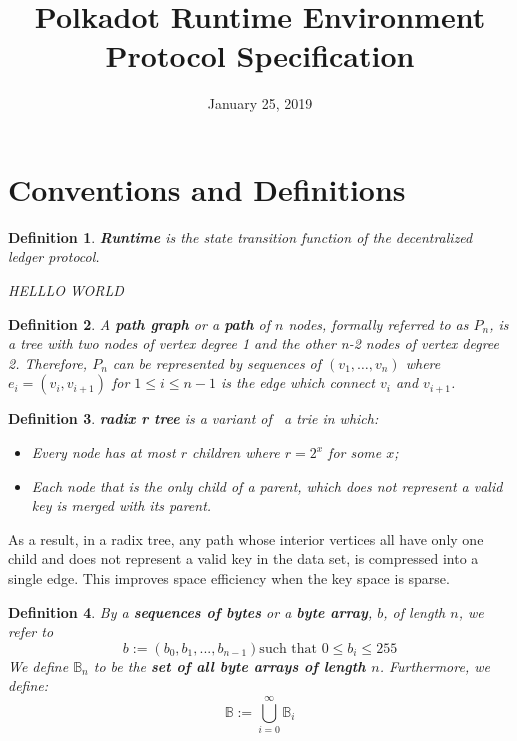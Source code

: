 \documentclass{article}
\newcommand{\assign}{:=}
\newcommand{\tmstrong}[1]{\textbf{#1}}
\newcommand{\tmtextbf}[1]{{\bfseries{#1}}}
\newtheorem{definition}{Definition}
\providecommand{\tmstrong}[1]{\tmtextbf{#1}}
\providecommand{\tmtextbf}[1]{\tmtextbf{#1}}
\newtheorem{definition}{Definition}
\begin{document}
\title{
  Polkadot Runtime Environment\\
  {\Large Protocol Specification}
}

\date{January 25, 2019}

\maketitle

\section{Conventions and Definitions}

\begin{definition}
  {\tmstrong{Runtime}} is the state transition function of the decentralized
  ledger protocol.
  
  HELLLO WORLD
\end{definition}

\begin{definition}
  \label{def-path-graph}A {\tmstrong{path graph}} or a {\tmstrong{path}} of
  $n$ nodes, formally referred to as {\tmstrong{$P_n$}}, is a tree with two
  nodes of vertex degree 1 and the other n-2 nodes of vertex degree 2.
  Therefore, $P_n$ can be represented by sequences of $(v_1, \ldots, v_n)$
  where $e_i = (v_i, v_{i + 1})$ for $1 \leqslant i \leqslant n - 1$ is the
  edge which connect $v_i$ and $v_{i + 1}$.
\end{definition}

\begin{definition}
  \label{def-radix-tree}{\tmstrong{radix r tree}} is a variant of \ a trie in
  which:
  \begin{itemize}
    \item Every node has at most $r$ children where $r = 2^x$ for some $x$;
    
    \item Each node that is the only child of a parent, which does not
    represent a valid key is merged with its parent.
  \end{itemize}
\end{definition}

As a result, in a radix tree, any path whose interior vertices all have only
one child and does not represent a valid key in the data set, is compressed
into a single edge. This improves space efficiency when the key space is
sparse.

\begin{definition}
  By a {\tmstrong{sequences of bytes}} or a {\tmstrong{byte array}}, $b$, of
  length $n$, we refer to
  \[ b \assign (b_0, b_1, ..., b_{n - 1})  \text{such that } 0 \leqslant b_i
     \leqslant 255 \]
  We define $\mathbb{B}_n$ to be the {\tmstrong{set of all byte arrays of
  length $n$}}. Furthermore, we define:
  \[ \mathbb{B} \assign \bigcup^{\infty}_{i = 0} \mathbb{B}_i \]
\end{definition}
\end{document}
